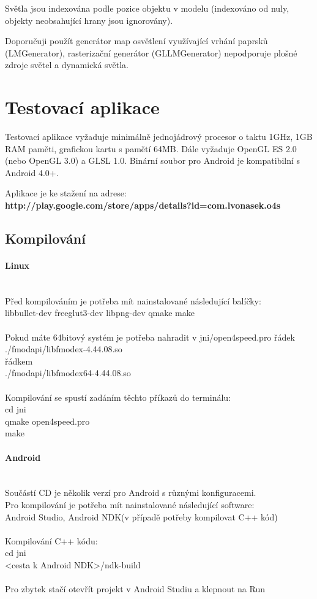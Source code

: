 \documentclass[11pt,twoside,a4paper]{book}
\begin{document}
Světla jsou indexována podle pozice objektu v modelu (indexováno od nuly, objekty neobsahující hrany jsou ignorovány).

Doporučuji použít generátor map osvětlení využívající vrhání paprsků (LMGenerator), rasterizační generátor (GLLMGenerator) nepodporuje plošné zdroje světel a dynamická světla.

\section{Testovací aplikace}
Testovací aplikace vyžaduje minimálně jednojádrový procesor o taktu 1GHz, 1GB RAM paměti, grafickou kartu s pamětí 64MB. Dále vyžaduje OpenGL ES 2.0 (nebo OpenGL 3.0) a GLSL 1.0. Binární soubor pro Android je kompatibilní s Android 4.0+.

\noindent Aplikace je ke stažení na adrese:\ \ \\
\textbf{http://play.google.com/store/apps/details?id=com.lvonasek.o4s}
\newpage

\subsection{Kompilování}

\paragraph{Linux}\ \ \\
Před kompilováním je potřeba mít nainstalované následující balíčky:\ \ \\
libbullet-dev freeglut3-dev libpng-dev qmake make\ \ \\
\ \ \\
Pokud máte 64bitový systém je potřeba nahradit v jni/open4speed.pro řádek\ \ \\
./fmodapi/libfmodex-4.44.08.so\ \ \\
řádkem\ \ \\
./fmodapi/libfmodex64-4.44.08.so\ \ \\
\ \ \\
Kompilování se spustí zadáním těchto příkazů do terminálu:\ \ \\
cd jni\ \ \\
qmake open4speed.pro\ \ \\
make

\paragraph{Android}\ \ \\
Součástí CD je několik verzí pro Android s různými konfiguracemi.\ \ \\
Pro kompilování je potřeba mít nainstalované následující software:\ \ \\
Android Studio, Android NDK(v případě potřeby kompilovat C++ kód)\ \ \\
\ \ \\
Kompilování C++ kódu:\ \ \\
cd jni\ \ \\
<cesta k Android NDK>/ndk-build\ \ \\
\ \ \\
Pro zbytek stačí otevřít projekt v Android Studiu a klepnout na Run
\end{document}
